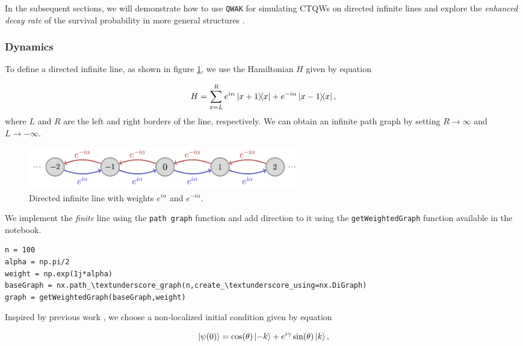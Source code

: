 \documentclass[main.tex]{subfiles}
\begin{document}
In the subsequent sections, we will demonstrate how to use \texttt{QWAK} for
simulating CTQWs on directed infinite lines and explore the \textit{enhanced
decay rate} of the survival probability \cite{abalEffects06} in more general
structures \cite{Chaves2023}.

\subsubsection{Dynamics}

To define a directed infinite line, as shown in figure \ref{fig:oriented_line},
we use the Hamiltonian $H$ given by equation 

\begin{equation}\label{hamiltonian}
    H = \sum_{x = L}^{R}e^{i\alpha}\ketbra{x+1}{x}+e^{-i\alpha}\ketbra{x-1}{x},
\end{equation}
where $L$ and $R$ are the left and right borders of
the line, respectively. We can obtain an infinite path graph by setting
$R\rightarrow\infty$ and $L\rightarrow -\infty$. 

\begin{figure}[!h]
    \centering
    \includegraphics[width=12cm]{img/QWAK/oriented_infinite_line.png}
    \caption{Directed infinite line with weights $e^{i\alpha}$ and $e^{-i\alpha}$.}
    \label{fig:oriented_line}
\end{figure}

We implement the \textit{finite} line using the \texttt{path\textunderscore
graph} function and add direction to it using the \texttt{getWeightedGraph}
function available in the notebook.

\begin{lstlisting}[style=code,escapeinside={__}]
n = 100
alpha = np.pi/2
weight = np.exp(1j*alpha)
baseGraph = nx.path_\textunderscore_graph(n,create_\textunderscore_using=nx.DiGraph)
graph = getWeightedGraph(baseGraph,weight)
\end{lstlisting}

Inspired by previous work \cite{abalEffects06}, we choose a non-localized
initial condition given by equation

\begin{equation}
    \label{eq:survProbInitCond}
    \ket{\psi(0)} = \cos(\theta)\ket{-k} + e^{i\gamma}\sin(\theta)\ket{k},
\end{equation}
\end{document}
